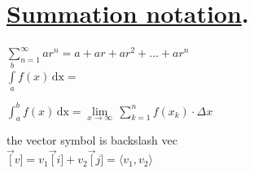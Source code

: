 \documentclass[11pt]{article}
\begin{document}
	
	\section{\underline{Summation notation}.}
	
$\displaystyle{\sum\limits_{n=1}^{\infty}ar^n =a+ar+ar^2+\ldots+ ar^n}$\\[6pt]	

$\displaystyle{\int\limits_{a}^{b}f(x) \, \mathrm{dx}=}$


$\displaystyle{\int_a^b f(x) \, \mathrm{dx}=\lim\limits_{x \to \infty}\,\sum\limits_{k=1}^{n} f(x_k)\cdot \Delta x }$

the vector symbol is backslash vec\\
$\vec[v]=v_1\vec[i]+v_2\vec[j]=\langle v_1, v_2 \rangle$
\end{document}
